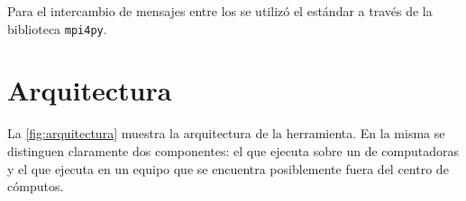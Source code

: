 Para el intercambio de mensajes entre los \ws se utilizó el
estándar \mpi a través de la biblioteca \texttt{mpi4py}\cite{mpi4py}.



\section{Arquitectura}

La \fig\ref{fig:arquitectura} muestra la arquitectura de la herramienta. En
la misma se distinguen claramente dos componentes: el \bend que ejecuta sobre
un \cluster de computadoras y el \fend que ejecuta en un equipo que se
encuentra posiblemente fuera del centro de cómputos.

